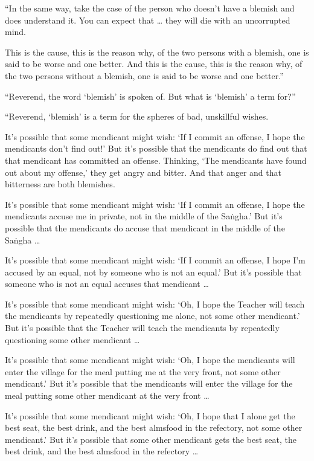 \documentclass[12pt,openany]{book}%
\begin{document}
“In the same way, take the case of the person who doesn’t have a blemish and does understand it. You can expect that … they will die with an uncorrupted mind. 

This is the cause, this is the reason why, of the two persons with a blemish, one is said to be worse and one better. And this is the cause, this is the reason why, of the two persons without a blemish, one is said to be worse and one better.” 

“Reverend, the word ‘blemish’ is spoken of. But what is ‘blemish’ a term for?” 

“Reverend, ‘blemish’ is a term for the spheres of bad, unskillful wishes. 

It’s possible that some mendicant might wish: ‘If I commit an offense, I hope the mendicants don’t find out!’ But it’s possible that the mendicants do find out that that mendicant has committed an offense. Thinking, ‘The mendicants have found out about my offense,’ they get angry and bitter. And that anger and that bitterness are both blemishes. 

It’s possible that some mendicant might wish: ‘If I commit an offense, I hope the mendicants accuse me in private, not in the middle of the \textsanskrit{Saṅgha}.’ But it’s possible that the mendicants do accuse that mendicant in the middle of the \textsanskrit{Saṅgha} … 

It’s possible that some mendicant might wish: ‘If I commit an offense, I hope I’m accused by an equal, not by someone who is not an equal.’ But it’s possible that someone who is not an equal accuses that mendicant … 

It’s possible that some mendicant might wish: ‘Oh, I hope the Teacher will teach the mendicants by repeatedly questioning me alone, not some other mendicant.’ But it’s possible that the Teacher will teach the mendicants by repeatedly questioning some other mendicant … 

It’s possible that some mendicant might wish: ‘Oh, I hope the mendicants will enter the village for the meal putting me at the very front, not some other mendicant.’ But it’s possible that the mendicants will enter the village for the meal putting some other mendicant at the very front … 

It’s possible that some mendicant might wish: ‘Oh, I hope that I alone get the best seat, the best drink, and the best almsfood in the refectory, not some other mendicant.’ But it’s possible that some other mendicant gets the best seat, the best drink, and the best almsfood in the refectory … 
\end{document}
